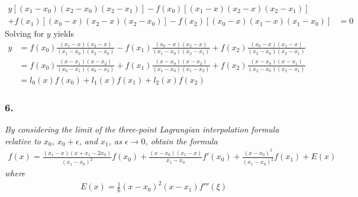 \documentclass[12pt]{article}
\begin{document}
\begin{align*}
y[(x_1 - x_0)(x_2 - x_0)(x_2 - x_1)] - f(x_0)[(x_1 - x)(x_2 - x)(x_2 - x_1)]& \\
+ f(x_1)[(x_0 - x)(x_2 - x)(x_2 - x_0)] - f(x_2)[(x_0 - x)(x_1 - x)(x_1 - x_0)]& = 0
\end{align*}
Solving for $y$ yields
\begin{align*}
y &= f(x_0)\frac{(x_1 - x)(x_2 - x)}{(x_1 - x_0)(x_2 - x_0)} - f(x_1)\frac{(x_0 - x)(x_2 - x)}{(x_1 - x_0)(x_2 - x_1)} + f(x_2)\frac{(x_0 - x)(x_1 - x)}{(x_2 - x_0)(x_2 - x_1)} \\
&= f(x_0)\frac{(x - x_1)(x - x_2)}{(x_0 - x_1)(x_0 - x_2)} + f(x_1)\frac{(x - x_0)(x - x_2)}{(x_1 - x_0)(x_1 - x_2)} + f(x_2)\frac{(x - x_0)(x - x_1)}{(x_2 - x_0)(x_2 - x_1)} \\
&= l_0(x)f(x_0) + l_1(x)f(x_1) + l_2(x)f(x_2)
\end{align*}

\subsubsection*{6.}

{\it By considering the limit of the three-point Lagrangian interpolation formula relative to $x_0$, $x_0 + \epsilon$, and $x_1$, as $\epsilon \rightarrow 0$, obtain the formula}
\begin{align*}
f(x) = \frac{(x_1 - x)(x + x_1 - 2x_0)}{(x_1 - x_0)^2}f(x_0) + \frac{(x - x_0)(x_1 - x)}{x_1 - x_0}f'(x_0) + \frac{(x - x_0)^2}{(x_1 - x_0)^2}f(x_1) + E(x)
\end{align*}
{\it where}
\begin{align*}
E(x) = \frac{1}{6}(x - x_0)^2(x - x_1)f'''(\xi)
\end{align*}
\end{document}
